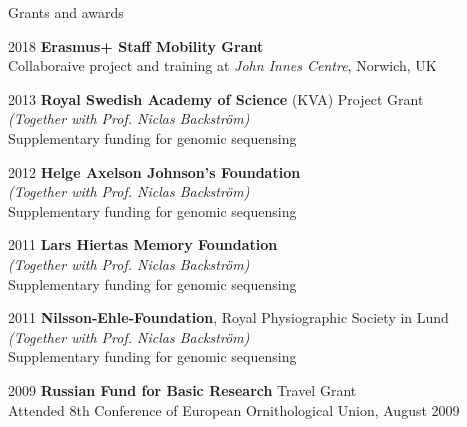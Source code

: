 \documentclass[10pt]{article}
\begin{document}
\begin{cv}
\begin{cvlist}{Grants and awards}
 \item[2018] \textbf{Erasmus+ Staff Mobility Grant}\\
 Collaboraive project and training at \textit{John Innes Centre}, Norwich, UK 
\item[2013] \textbf{Royal Swedish Academy of Science} (KVA) Project Grant \\
 \textit{(Together with Prof. Niclas Backstr\"om)} \\
 Supplementary funding for genomic sequensing %
\item[2012] \textbf{Helge Axelson Johnson's Foundation}\\
 \textit{(Together with Prof. Niclas Backstr\"om)} \\
 Supplementary funding for genomic sequensing
\item[2011] \textbf{Lars Hiertas Memory Foundation} \\
 \textit{(Together with Prof. Niclas Backstr\"om)} \\
 Supplementary funding for genomic sequensing
\item[2011] \textbf{Nilsson-Ehle-Foundation}, Royal Physiographic Society in Lund \\
 \textit{(Together with Prof. Niclas Backstr\"om)} \\
 Supplementary funding for genomic sequensing
\item[2009] \textbf{Russian Fund for Basic Research} Travel Grant\\
Attended 8th Conference of European Ornithological Union, August 2009
\end{cvlist}








\end{cv}
\end{document}
